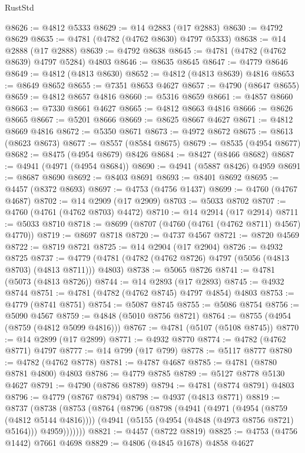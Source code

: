 \begin{lexlean}{RustStd}
\begin{coremodule}
@8626 := @4812 @5333
@8629 := @14 @2883 (@17 @2883)
@8630 := @4792 @8629
@8635 := @4781 (@4782 (@4762 @8630) @4797 @5333)
@8638 := @14 @2888 (@17 @2888)
@8639 := @4792 @8638
@8645 := @4781 (@4782 (@4762 @8639) @4797 @5284) @4803
@8646 := @8635 @8645
@8647 := @4779 @8646
@8649 := @4812 (@4813 @8630)
@8652 := @4812 (@4813 @8639) @4816
@8653 := @8649 @8652
@8655 := @7351 @8653 @4627
@8657 := @4790 (@8647 @8655)
@8659 := @4812 @8657 @4816
@8660 := @5316 @8659
@8661 := @4857 @8660
@8663 := @7330 @8661 @4627
@8665 := @4812 @8663 @4816
@8666 := @8626 @8665
@8667 := @5201 @8666
@8669 := @8625 @8667 @4627
@8671 := @4812 @8669 @4816
@8672 := @5350 @8671
@8673 := @4972 @8672
@8675 := @8613 (@8623 @8673)
@8677 := @8557 (@8584 @8675)
@8679 := @8535 (@4954 @8677)
@8682 := @8475 (@4954 @8679) @8426
@8684 := @8427 (@8466 @8682)
@8687 := @4941 (@4971 (@4954 @8684))
@8690 := @4941 (@5887 @8426) @4959
@8691 := @8687 @8690
@8692 := @8403 @8691
@8693 := @8401 @8692
@8695 := @4457 (@8372 @8693)
@8697 := @4753 (@4756 @1437)
@8699 := @4760 (@4767 @4687)
@8702 := @14 @2909 (@17 @2909)
@8703 := @5033 @8702
@8707 := @4760 (@4761 (@4762 @8703) @4472)
@8710 := @14 @2914 (@17 @2914)
@8711 := @5033 @8710
@8718 := @8699 (@8707 (@4760 (@4761 (@4762 @8711) @4567) @4770))
@8719 := @8697 @8718
@8720 := @4737 @4567
@8721 := @8720 @4569
@8722 := @8719 @8721
@8725 := @14 @2904 (@17 @2904)
@8726 := @4932 @8725
@8737 := @4779 (@4781 (@4782 (@4762 @8726) @4797 (@5056 (@4813 @8703) (@4813 @8711))) @4803)
@8738 := @5065 @8726
@8741 := @4781 (@5073 (@4813 @8726))
@8744 := @14 @2893 (@17 @2893)
@8745 := @4932 @8744
@8751 := @4781 (@4782 (@4762 @8745) @4797 @4854) @4803
@8753 := @4779 (@8741 @8751)
@8754 := @5087 @8745
@8755 := @5086 @8754
@8756 := @5090 @4567
@8759 := @4848 (@5010 @8756 @8721)
@8764 := @8755 (@4954 (@8759 (@4812 @5099 @4816)))
@8767 := @4781 (@5107 (@5108 @8745))
@8770 := @14 @2899 (@17 @2899)
@8771 := @4932 @8770
@8774 := @4782 (@4762 @8771) @4797
@8777 := @14 @799 (@17 @799)
@8778 := @5117 @8777
@8780 := @4782 (@4762 @8778)
@8781 := @4787 @4687
@8785 := @4781 (@8780 @8781 @4800) @4803
@8786 := @4779 @8785
@8789 := @5127 @8778 @5130 @4627
@8791 := @4790 (@8786 @8789)
@8794 := @4781 (@8774 @8791) @4803
@8796 := @4779 (@8767 @8794)
@8798 := @4937 (@4813 @8771)
@8819 := @8737
    (@8738
      (@8753
        (@8764
          (@8796
            (@8798
              (@4941
                (@4971 (@4954 (@8759 (@4812 @5144 @4816))))
                (@4941 (@5155 (@4954 (@4848 (@4973 @8756 @8721) @5164))) @4959)))))))
@8821 := @4457 (@8722 @8819)
@8825 := @4753 (@4756 @1442) @7661 @4698
@8829 := @4806 (@4845 @1678) @4858 @4627

\end{coremodule}
\end{lexlean}
